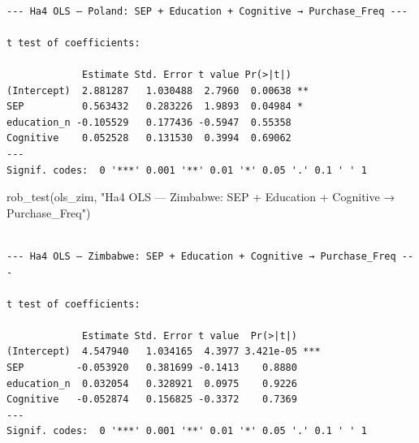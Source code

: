 \documentclass[
  letterpaper,
  DIV=11,
  numbers=noendperiod]{scrartcl}
\newenvironment{Shaded}{\begin{snugshade}}{\end{snugshade}}
\newcommand{\FunctionTok}[1]{\textcolor[rgb]{0.28,0.35,0.67}{#1}}
\newcommand{\NormalTok}[1]{\textcolor[rgb]{0.00,0.23,0.31}{#1}}
\newcommand{\StringTok}[1]{\textcolor[rgb]{0.13,0.47,0.30}{#1}}
\begin{document}
\begin{verbatim}

--- Ha4 OLS — Poland: SEP + Education + Cognitive → Purchase_Freq ---

t test of coefficients:

             Estimate Std. Error t value Pr(>|t|)   
(Intercept)  2.881287   1.030488  2.7960  0.00638 **
SEP          0.563432   0.283226  1.9893  0.04984 * 
education_n -0.105529   0.177436 -0.5947  0.55358   
Cognitive    0.052528   0.131530  0.3994  0.69062   
---
Signif. codes:  0 '***' 0.001 '**' 0.01 '*' 0.05 '.' 0.1 ' ' 1
\end{verbatim}

\begin{Shaded}
\begin{Highlighting}[]
\FunctionTok{rob\_test}\NormalTok{(ols\_zim, }
         \StringTok{"Ha4 OLS — Zimbabwe: SEP + Education + Cognitive → Purchase\_Freq"}\NormalTok{)}
\end{Highlighting}
\end{Shaded}

\begin{verbatim}

--- Ha4 OLS — Zimbabwe: SEP + Education + Cognitive → Purchase_Freq ---

t test of coefficients:

             Estimate Std. Error t value  Pr(>|t|)    
(Intercept)  4.547940   1.034165  4.3977 3.421e-05 ***
SEP         -0.053920   0.381699 -0.1413    0.8880    
education_n  0.032054   0.328921  0.0975    0.9226    
Cognitive   -0.052874   0.156825 -0.3372    0.7369    
---
Signif. codes:  0 '***' 0.001 '**' 0.01 '*' 0.05 '.' 0.1 ' ' 1
\end{verbatim}
\end{document}
